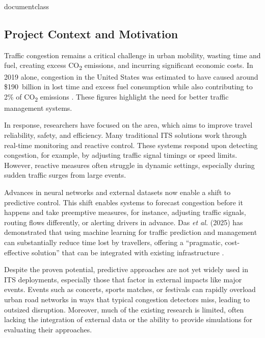 \csname documentclass
\graphicspath{{\subfix{../images/}}}


\subsection{Project Context and Motivation}
Traffic congestion remains a critical challenge in urban mobility, wasting time and fuel, creating excess CO\textsubscript{2} emissions, and incurring significant economic costs. In 2019 alone, congestion in the United States was estimated to have caused around \$190~billion in lost time and excess fuel consumption while also contributing to 2\% of CO\textsubscript{2} emissions \cite{office_intelligent_nodate, noauthor_emissions_2022}. These figures highlight the need for better traffic management systems.

In response, researchers have focused on the  area, which aims to improve travel reliability, safety, and efficiency. Many traditional ITS solutions work through real-time monitoring and reactive control. These systems respond upon detecting congestion, for example, by adjusting traffic signal timings or speed limits. However, reactive measures often struggle in dynamic settings, especially during sudden traffic surges from large events.

Advances in neural networks and external datasets now enable a shift to predictive control. This shift enables systems to forecast congestion before it happens and take preemptive measures, for instance, adjusting traffic signals, routing flows differently, or alerting drivers in advance. Das \textit{et al.} (2025) has demonstrated that using machine learning for traffic prediction and management can substantially reduce time lost by travellers, offering a “pragmatic, cost-effective solution” that can be integrated with existing infrastructure \cite{das_traffic_2025}.

Despite the proven potential, predictive approaches are not yet widely used in ITS deployments, especially those that factor in external impacts like major events. Events such as concerts, sports matches, or festivals can rapidly overload urban road networks in ways that typical congestion detectors miss, leading to outsized disruption. Moreover, much of the existing research is limited, often lacking the integration of external data or the ability to provide simulations for evaluating their approaches.

